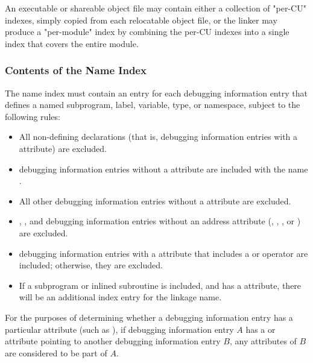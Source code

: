An executable or shareable object file may contain either a collection of
"per-CU" indexes, simply copied from each relocatable object
file, or the linker may produce a "per-module" index by
combining the per-CU indexes into a single index that covers
the entire 
\db
module.

\subsubsection{Contents of the Name Index}
\label{chap:contentsofthenameindex}
The name index must contain an entry for each 
debugging information entry that defines a
named subprogram, label, variable, type, or namespace, 
subject to the following rules:
\begin{itemize}

\item All non-defining declarations (that is, 
      debugging information entries with a
      \DWATdeclaration{} attribute) are excluded.

\item \DWTAGnamespace{} debugging information entries 
      without a \DWATname{} attribute are
      included with the name 
      .

\item All other debugging information entries 
      without a \DWATname{} attribute are excluded.

\item \DWTAGsubprogram{}, \DWTAGinlinedsubroutine{}, and
      \DWTAGlabel{} debugging information entries 
      without an address attribute (\DWATlowpc{},
      \DWAThighpc{}, \DWATranges{}, or \DWATentrypc{}) 
      are excluded.

\item \DWTAGvariable{} debugging information entries 
      with a \DWATlocation{} attribute that includes a 
      \DWOPaddr{} or \DWOPformtlsaddress{} operator are
      included; otherwise, they are excluded.

\item If a subprogram or inlined subroutine is included, and has a
      \DWATlinkagename{} attribute, there will be an additional
      index entry for the linkage name.
      
\end{itemize}

For the purposes of determining whether a 
debugging information entry has a particular
attribute (such as \DWATname{}), if 
debugging information entry $A$ has a \DWATspecification{}
or \DWATabstractorigin{} attribute pointing to another 
debugging information entry $B$, any
attributes of $B$ are considered to be part of $A$.

